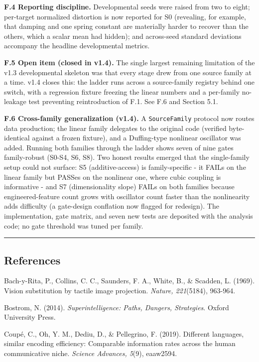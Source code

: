 \documentclass[
  11pt,
]{article}
\begin{document}
\textbf{F.4 Reporting discipline.} Developmental seeds
were raised from two to eight; per-target normalized
distortion is now reported for S0 (revealing, for
example, that damping and one spring constant are
materially harder to recover than the others, which a
scalar mean had hidden); and across-seed standard
deviations accompany the headline developmental
metrics.

\textbf{F.5 Open item (closed in v1.4).} The single
largest remaining limitation of the v1.3 developmental
skeleton was that every stage drew from one source
family at a time. v1.4 closes this: the ladder runs
across a source-family registry behind one switch, with
a regression fixture freezing the linear numbers and a
per-family no-leakage test preventing reintroduction of
F.1. See F.6 and Section 5.1.

\textbf{F.6 Cross-family generalization (v1.4).} A
\texttt{SourceFamily} protocol now routes data
production; the linear family delegates to the original
code (verified byte-identical against a frozen
fixture), and a Duffing-type nonlinear oscillator was
added. Running both families through the ladder shows
seven of nine gates family-robust (S0-S4, S6, S8). Two
honest results emerged that the single-family setup
could not surface: S5 (additive-access) is
family-specific - it FAILs on the linear family but
PASSes on the nonlinear one, where cubic coupling is
informative - and S7 (dimensionality slope) FAILs on
both families because engineered-feature count grows
with oscillator count faster than the nonlinearity adds
difficulty (a gate-design conflation now flagged for
redesign). The implementation, gate matrix, and seven
new tests are deposited with the analysis code; no gate
threshold was tuned per family.

\begin{center}\rule{0.5\linewidth}{0.5pt}\end{center}

\subsection{References}\label{references}

Bach-y-Rita, P., Collins, C. C., Saunders, F. A.,
White, B., \& Scadden, L. (1969). Vision substitution
by tactile image projection. \emph{Nature, 221}(5184),
963-964.

Bostrom, N. (2014). \emph{Superintelligence: Paths,
Dangers, Strategies}. Oxford University Press.

Coupé, C., Oh, Y. M., Dediu, D., \& Pellegrino, F.
(2019). Different languages, similar encoding
efficiency: Comparable information rates across the
human communicative niche. \emph{Science Advances,
5}(9), eaaw2594.
\end{document}
